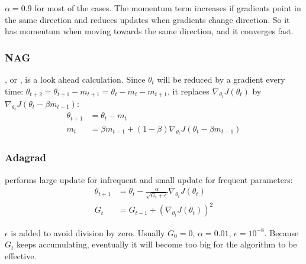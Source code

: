 $\alpha=0.9$ for most of the cases. The momentum term increases if gradients point in the same direction and reduces updates when gradients change direction. So it has momentum when moving towards the same direction, and it converges fast.





\subsubsection{NAG}

\cite{NESTEROV1983}, or , is a look ahead calculation. Since $\theta_t$ will be reduced by a gradient every time: $\theta_{t+2} = \theta_{t+1} - m_{t+1} = \theta_t - m_t - m_{t+1}$, it replaces $\nabla_{\theta_t} J(\theta_t)$ by $\nabla_{\theta_t} J(\theta_t - \beta m_{t-1})$:
\begin{equation}
    \begin{aligned}
        \theta_{t+1} &= \theta_t - m_t \\
        m_t &= \beta m_{t-1} + (1-\beta) \nabla_{\theta_t} J(\theta_t - \beta m_{t-1})
    \end{aligned}
\end{equation}




\subsubsection{Adagrad}

\cite{Duchi2012} performs large update for infrequent and small update for frequent parameters:
\begin{equation}
    \begin{aligned}
        \theta_{t+1} &= \theta_t - \frac{\alpha}{\sqrt{G_t + \epsilon}}  \nabla_{\theta_t} J(\theta_t) \\
        G_t &= G_{t-1} + \left(\nabla_{\theta_t} J(\theta_t) \right)^2
    \end{aligned}
\end{equation}

$\epsilon$ is added to avoid division by zero. Usually $G_0 = 0$, $\alpha = 0.01$, $\epsilon = 10^{-8}$. Because $G_t$ keeps accumulating, eventually it will become too big for the algorithm to be effective.




